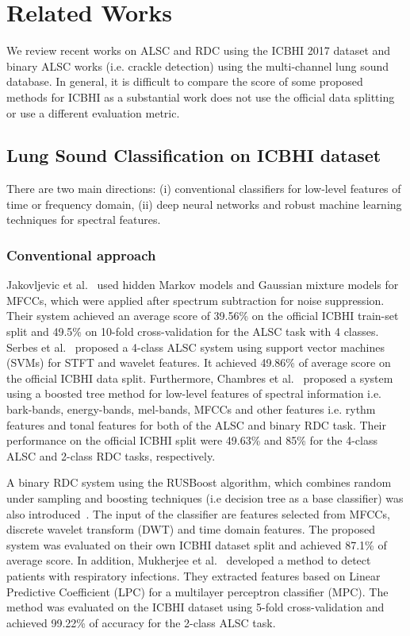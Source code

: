 \documentclass[journal]{IEEEtran}
\begin{document}
\section{Related Works}
We review recent works on ALSC and RDC using the ICBHI 2017 dataset and binary ALSC works (i.e. crackle detection) using the multi-channel lung sound database. In general, it is difficult to compare the score of some proposed methods for ICBHI as a substantial work does not use the official data splitting or use a different evaluation metric.
\subsection{Lung Sound Classification on ICBHI dataset}
There are two main directions: (i) conventional classifiers for low-level features of time or frequency domain, (ii) deep neural networks and robust machine learning techniques for spectral features. 
\subsubsection{Conventional approach}
Jakovljevic et al.~\cite{jakovljevic2017hidden} used hidden Markov models and Gaussian mixture models for MFCCs, which were applied after spectrum subtraction for noise suppression. Their system achieved an average score of 39.56\% on the official ICBHI train-set split and 49.5\% on 10-fold cross-validation for the ALSC task with 4 classes. 
Serbes et al.~\cite{serbes2017automated} proposed a 4-class ALSC system using support vector machines (SVMs) for STFT and wavelet features. It achieved 49.86\% of average score on the official ICBHI data split. 
Furthermore, Chambres et al.~\cite{chambres2018automatic} proposed a system using a boosted tree method for low-level features of spectral information i.e. bark-bands, energy-bands, mel-bands, MFCCs and other features i.e. rythm features and tonal features for both of the ALSC and binary RDC task. Their performance on the official ICBHI split were 49.63\% and 85\% for the 4-class ALSC and 2-class RDC tasks, respectively. 

A binary RDC system using the RUSBoost algorithm, which combines random under sampling and boosting techniques (i.e decision tree as a base classifier) was also introduced~\cite{kok2019novel}. The input of the classifier are features selected from MFCCs, discrete wavelet transform (DWT) and time domain features. The proposed system was evaluated on their own ICBHI dataset split and achieved 87.1\% of average score. 
In addition, Mukherjee et al.~\cite{mukherjee2021automatic} developed a method to detect patients with respiratory infections. They extracted features based on Linear Predictive Coefficient (LPC) for a multilayer perceptron classifier (MPC). The method was evaluated on the ICBHI dataset using 5-fold cross-validation and achieved 99.22\% of accuracy for the 2-class ALSC task.
\end{document}
